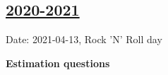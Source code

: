\begin{enumerate}
	


\end{enumerate}

    

\subsection[2020-2021]{\hyperref[sec:sol_kr_03_2020_2021]{2020-2021}}
\label{sec:kr_03_2020_2021} %

Date: 2021-04-13, Rock 'N' Roll day


\textbf{Estimation questions}

